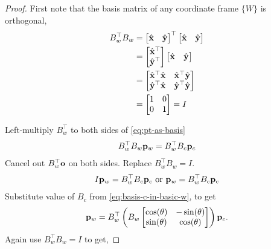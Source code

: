 \documentclass[twocolumn]{article}
\begin{document}
\begin{proof}
  First note  that the basis matrix of any coordinate frame $\{W\}$ is
  orthogonal,
  \begin{align}
    B_w^\top B_w &= \begin{bmatrix}  \hat{\mathbf{x}} &  \hat{\mathbf{y}} \end{bmatrix}^\top
         \begin{bmatrix}  \hat{\mathbf{x}} &  \hat{\mathbf{y}} \end{bmatrix}
    \notag\\
    &=
    \begin{bmatrix}  \hat{\mathbf{x}}^\top \\  \hat{\mathbf{y}}^\top \end{bmatrix}
                                  \begin{bmatrix}  \hat{\mathbf{x}} &  \hat{\mathbf{y}} \end{bmatrix}
    \notag\\
    &=   \begin{bmatrix}  \hat{\mathbf{x}}^\top\hat{\mathbf{x}}  &   \hat{\mathbf{x}}^\top\hat{\mathbf{y}}
      \\  \hat{\mathbf{y}}^\top\hat{\mathbf{x}}  &  \hat{\mathbf{y}}^\top\hat{\mathbf{y}} \end{bmatrix}
    \notag\\
                 &=  \begin{bmatrix}
                   1 &  0  \\   0   &  1
                 \end{bmatrix} = I
  \end{align}

  Left-multiply $B_w^\top$ to both sides of \eqref{eq:pt-as-basis}
  \begin{align}
    B_w^\top  B_w \mathbf{p}_w = B_w^\top   B_c  \mathbf{p}_c
    \end{align}
    Cancel out $B_w^\top \mathbf{o}$ on both sides.  Replace $B_w^\top  B_w = I$.
    \begin{align}
      I \mathbf{p}_w = B_w^\top   B_c  \mathbf{p}_c
      \text{ or } \mathbf{p}_w = B_w^\top   B_c  \mathbf{p}_c
    \end{align}
    Substitute value  of $B_c$  from 
    \eqref{eq:basis-c-in-basic-w}, to get
    \begin{align}
      \mathbf{p}_w = B_w^\top   \left( B_w  \begin{bmatrix} \cos(\theta) &  -\sin(\theta) \\
        \sin(\theta) &   \cos(\theta) \end{bmatrix}   \right)\mathbf{p}_c.
    \end{align}
    Again  use $B_w^\top  B_w = I$ to get,


\end{proof}
\end{document}
